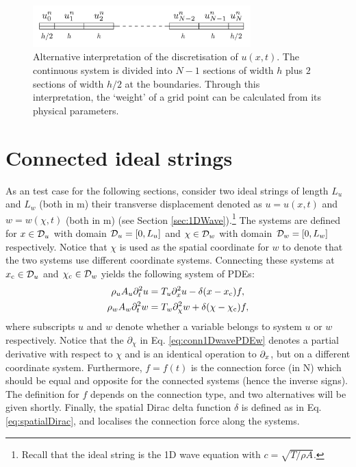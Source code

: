 \begin{figure}[h]
    \centering
    \includegraphics[width=0.75\textwidth]{figures/fdtd/gridFigure2.pdf}
    \caption{Alternative interpretation of the discretisation of $u(x,t)$. The continuous system is divided into $N-1$ sections of width $h$ plus $2$ sections of width $h/2$ at the boundaries. Through this interpretation, the `weight' of a grid point can be calculated from its physical parameters. \label{fig:gridExp2}}
\end{figure}

\section{Connected ideal strings}
As an test case for the following sections, consider two ideal strings of length $L_u$ and $L_w$ (both in m) their transverse displacement denoted as $u=u(x,t)$ and $w = w(\chi,t)$ (both in m) (see Section \ref{sec:1DWave}).\footnote{Recall that the ideal string is the 1D wave equation with $c=\sqrt{T/\rho A}$.}  The systems are defined for $x\in \mathcal{D}_u$ with domain $\mathcal{D}_u=[0,L_u]$ and $\chi \in \mathcal{D}_w$ with domain $\mathcal{D}_w=[0,L_w]$ respectively. Notice that $\chi$ is used as the spatial coordinate for $w$ to denote that the two systems use different coordinate systems. Connecting these systems at $x_{\text{c}}\in \mathcal{D}_u$ and $\chi_{\text{c}}\in\mathcal{D}_w$ yields the following system of PDEs:
\begin{subequations}\label{eq:conn1DwavePDE}
    \begin{align}
        \rho_u A_u \partial_t^2 u &= T_u \partial_x^2 u -\delta(x-x_{\text{c}})f, \label{eq:conn1DwavePDEu} \\
        \rho_w A_w \partial_t^2 w &= T_w \partial_\chi^2 w + \delta(\chi-\chi_{\text{c}})f,\label{eq:conn1DwavePDEw}
    \end{align}
\end{subequations}
where subscripts $u$ and $w$ denote whether a variable belongs to system $u$ or $w$ respectively. Notice that the $\partial_\chi$ in Eq. \eqref{eq:conn1DwavePDEw} denotes a partial derivative with respect to $\chi$ and is an identical operation to $\partial_x$, but on a different coordinate system. Furthermore, $f = f(t)$ is the connection force (in N) which should be equal and opposite for the connected systems (hence the inverse signs). The definition for $f$ depends on the connection type, and two alternatives will be given shortly. Finally, the spatial Dirac delta function $\delta$ is defined as in Eq. \eqref{eq:spatialDirac}, and localises the connection force along the systems.


